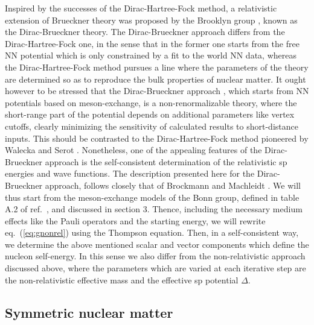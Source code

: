 Inspired
by the successes of the Dirac-Hartree-Fock method, a relativistic
extension of Brueckner theory was proposed by the Brooklyn group
\cite{brook}, known as the Dirac-Brueckner theory.
The Dirac-Brueckner approach differs from the Dirac-Hartree-Fock one,
in the sense that in the former one starts from the free NN potential
which is only constrained by a fit to the world NN data, whereas the
Dirac-Hartree-Fock method pursues a line where the parameters of the
theory are determined so as to reproduce the bulk properties
of nuclear matter. It ought however to be stressed that the Dirac-Brueckner
approach \cite{bm90,brook,hm87},
which starts from NN potentials based on meson-exchange,
is a non-renormalizable theory, where the short-range part
of the potential depends on additional parameters like
vertex cutoffs, clearly minimizing the
sensitivity of calculated results to short-distance inputs. This
should be contrasted to the Dirac-Hartree-Fock
method pioneered by Walecka and Serot \cite{sw86,ser92}.
Nonetheless, one of the appealing features of the Dirac-Brueckner approach
is the self-consistent determination of the relativistic sp
energies and wave functions.
The description presented here for the Dirac-Brueckner approach, follows
closely that of Brockmann and Machleidt \cite{bm90}. We will thus
start from the meson-exchange models of the Bonn group, defined
in table A.2 of ref.\ \cite{mac89}, and discussed in section 3.
Thence, including the necessary medium effects like the
Pauli operators and the starting
energy, we will rewrite eq.\ (\ref{eq:gnonrel}) using 
the Thompson equation. Then, in a self-consistent way, we
determine the above mentioned scalar and vector components  which
define the nucleon self-energy. In this sense we also differ
from the non-relativistic approach discussed above, where the
parameters which are varied at each iterative step are the
non-relativistic effective mass and the effective sp potential
$\Delta$.

\subsection{Symmetric nuclear matter}

